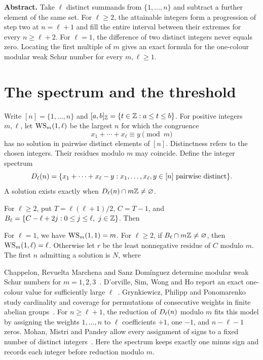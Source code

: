 \documentclass[11pt,a4paper]{article}
\begin{document}

\noindent\textbf{Abstract.}
Take \(\ell\) distinct summands from \(\{1,\ldots,n\}\) and subtract a further element of the same set. For \(\ell\ge2\), the attainable integers form a progression of step two at \(n=\ell+1\) and fill the entire interval between their extremes for every \(n\ge\ell+2\). For \(\ell=1\), the difference of two distinct integers never equals zero. Locating the first multiple of \(m\) gives an exact formula for the one-colour modular weak Schur number for every \(m,\ell\ge1\).

\section{The spectrum and the threshold}
Write \([n]=\{1,\ldots,n\}\) and \([a,b]_{\mathbb Z}=\{t\in\mathbb Z:a\le t\le b\}\).
For positive integers \(m,\ell\), let \(\operatorname{WS}_m(1,\ell)\) be the largest \(n\) for which the congruence
\[
  x_1+\cdots+x_\ell\equiv y\pmod m
\]
has no solution in pairwise distinct elements of \([n]\). Distinctness refers to the chosen integers. Their residues modulo \(m\) may coincide. Define the integer spectrum
\[
  D_\ell(n)=
  \{x_1+\cdots+x_\ell-y : x_1,\ldots,x_\ell,y\in[n]\text{ pairwise distinct}\}.
\]
A solution exists exactly when \(D_\ell(n)\cap m\mathbb Z\ne\varnothing\).

For \(\ell\ge2\), put \(T=\ell(\ell+1)/2\), \(C=T-1\), and
\(\B=\{C-\ell+2j:0\le j\le\ell,\ j\in\Z\}\). Then
\spectrumdisplay

For \(\ell=1\), we have \(\operatorname{WS}_m(1,1)=m\).
For \(\ell\ge2\), if \(B_\ell\cap m\mathbb Z\ne\varnothing\), then \(\operatorname{WS}_m(1,\ell)=\ell\).
Otherwise let \(r\) be the least nonnegative residue of \(C\) modulo \(m\).
The first \(n\) admitting a solution is \(N\), where
\thresholdformula


Chappelon, Revuelta Marchena and Sanz Domínguez determine modular weak Schur numbers for \(m=1,2,3\)~\cite{chappelon}. D'orville, Sim, Wong and Ho report an exact one-colour value for sufficiently large \(\ell\)~\cite{dorville}. Grynkiewicz, Philipp and Ponomarenko study cardinality and coverage for permutations of consecutive weights in finite abelian groups~\cite{grynkiewicz}. For \(n\ge\ell+1\), the reduction of \(D_\ell(n)\) modulo \(m\) fits this model by assigning the weights \(1,\ldots,n\) to \(\ell\) coefficients \(+1\), one \(-1\), and \(n-\ell-1\) zeros. Mohan, Mistri and Pandey allow every assignment of signs to a fixed number of distinct integers~\cite{mohan}. Here the spectrum keeps exactly one minus sign and records each integer before reduction modulo \(m\).
\end{document}

